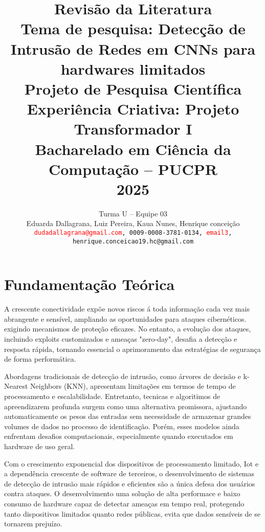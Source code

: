 \documentclass[conference]{IEEEtran}
\newcommand\red[1]{{\textcolor{red}{#1}}}
\begin{document}

\title{Revisão da Literatura\\
\vspace{0.4cm}
Tema de pesquisa: Detecção de Intrusão de Redes em CNNs para hardwares limitados\\
\vspace{0.4cm}
{\Large Projeto de Pesquisa Científica\\
Experiência Criativa: Projeto Transformador I\\
Bacharelado em Ciência da Computação -- PUCPR\\
2025}}

\author{
    Turma U -- Equipe 03 \\
    Eduarda Dallagrana,  Luiz Pereira, Kaua Nunes, Henrique conceição \\
    {\tt\small \red{dudadallagrana@gmail.com}, 0009-0008-3781-0134, \red{email3}, henrique.conceicao19.hc@gmail.com}
}
\maketitle


\section{Fundamentação Teórica}

A crescente conectividade expõe novos riscos á toda informação cada vez mais abrangente e sensível, ampliando as oportunidades para ataques cibernéticos. exigindo mecanismos de proteção eficazes. No entanto, a evolução dos ataques, incluindo exploits customizados e ameaças "zero-day", desafia a detecção e resposta rápida, tornando essencial o aprimoramento das estratégias de segurança de forma performática.

Abordagens tradicionais de detecção de intrusão, como árvores de decisão e k-Nearest Neighbors (KNN), apresentam limitações em termos de tempo de processamento e escalabilidade. Entretanto, tecnicas e algoritimos de apreendizarem profunda surgem como uma alternativa promissora, ajustando automaticamente os pesos das entradas sem necessidade de armazenar grandes volumes de dados no processo de identificação. Porém, esses modelos ainda enfrentam desafios computacionais, especialmente quando executados em hardware de uso geral.

Com o crescimento exponencial dos dispositivos de processamento limitado, Iot e a dependência crescente de software de terceiros, o desenvolvimento de sistemas de detecção de intrusão mais rápidos e eficientes são a única defesa dos usuários contra ataques. O desenvolvimento uma solução de alta performace e baixo consumo de hardware capaz de detectar ameaças em tempo real, protegendo tanto dispositivos limitados quanto redes públicas, evita que dados sensíveis de se tornarem prejuízo.
\end{document}
